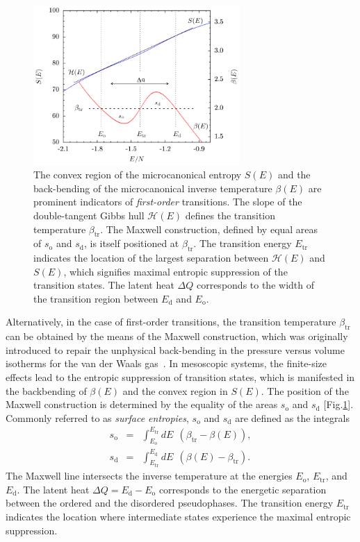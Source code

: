 \documentclass[12pt]{report}
\begin{document}
%
\begin{figure}
\center
\includegraphics[width = 0.7\textwidth]{chapter2Figs/maxwellConstruct.eps}
\caption{\label{fig:Fig_2}%
The convex region of the microcanonical entropy $S(E)$ and the back-bending of the microcanonical inverse temperature $\beta(E)$ are prominent indicators of \textit{first-order} transitions. The slope of the double-tangent Gibbs hull $\mathcal{H}(E)$ defines the transition temperature $\beta_{\mathrm{tr}}$. The Maxwell construction, defined by equal areas of $s_{\mathrm{o}}$ and $s_{\mathrm{d}}$, is itself positioned at $\beta_{\mathrm{tr}}$. The transition energy $E_{\mathrm{tr}}$ indicates the location of the largest separation between $\mathcal{H}(E)$ and $S(E)$, which signifies maximal entropic suppression of the transition states. The latent heat $\Delta Q$ corresponds to the width of the transition region between $E_{\mathrm{d}}$ and $E_{\mathrm{o}}$.}
\end{figure}
%
Alternatively, in the case of first-order transitions, the transition temperature $\beta_{\mathrm{tr}}$ can be obtained by the means of the Maxwell construction, which was originally introduced to repair the unphysical back-bending in the pressure versus volume isotherms for the van der Waals gas~\cite{Bachmann2014}. In mesoscopic systems, the finite-size effects lead to the entropic suppression of transition states, which is manifested in the backbending of $\beta(E)$ and the convex region in $S(E)$. The position of the Maxwell construction is determined by the equality of the areas $s_{\mathrm{o}}$ and $s_{\mathrm{d}}$ [Fig.\ref{fig:Fig_2}]. Commonly referred to as \textit{surface entropies}, $s_{\mathrm{o}}$ and $s_{\mathrm{d}}$ are defined as the integrals
\begin{eqnarray}
\label{eq:surfaceEntr}
s_{\mathrm{o}} &=& \int_{E_{\mathrm{o}}}^{E_{\mathrm{tr}}} dE \:\: (\beta_{\mathrm{tr}}-\beta(E)), \\
s_{\mathrm{d}} &=& \int_{E_{\mathrm{tr}}}^{E_{\mathrm{d}}} dE \:\: (\beta(E)-\beta_{\mathrm{tr}}).
\end{eqnarray}
The Maxwell line intersects the inverse temperature at the energies $E_{\mathrm{o}}$, $E_{\mathrm{tr}}$, and $E_{\mathrm{d}}$. The latent heat
$\Delta Q = E_{\mathrm{d}} - E_{\mathrm{o}}$ corresponds to the energetic separation between the ordered and the disordered pseudophases. The transition energy $E_{\mathrm{tr}}$ indicates the location where intermediate states experience the maximal entropic suppression\cite{Bachmann2014}.
\end{document}
